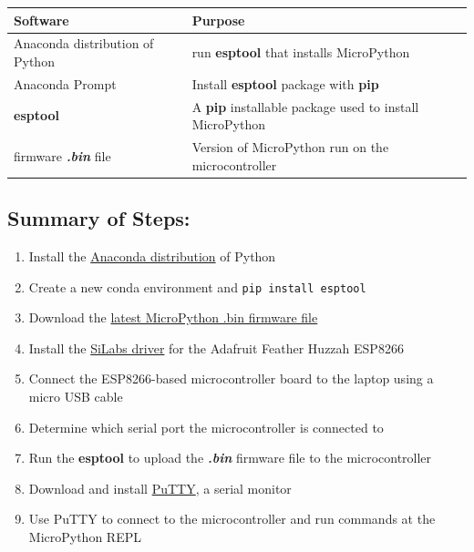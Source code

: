 \documentclass{book}
\providecommand{\tightlist}{%
      \setlength{\itemsep}{0pt}\setlength{\parskip}{0pt}}
\begin{document}
\begin{longtable}[]{@{}ll@{}}
\toprule
Software & Purpose\tabularnewline
\midrule
\endhead
Anaconda distribution of Python & run \textbf{esptool} that installs
MicroPython\tabularnewline
Anaconda Prompt & Install \textbf{esptool} package with
\textbf{pip}\tabularnewline
\textbf{esptool} & A \textbf{pip} installable package used to install
MicroPython\tabularnewline
firmware \textbf{\emph{.bin}} file & Version of MicroPython run on the
microcontroller\tabularnewline
\bottomrule
\end{longtable}
    




    
        \subsection{Summary of Steps:}\label{summary-of-steps}
    




    
        \begin{enumerate}
\def\labelenumi{\arabic{enumi}.}
\tightlist
\item
  Install the \href{https://www.anaconda.com/download/}{Anaconda
  distribution} of Python
\item
  Create a new conda environment and \lstinline!pip install esptool!
\item
  Download the \href{http://micropython.org/download\#esp8266}{latest
  MicroPython .bin firmware file}
\item
  Install the
  \href{https://www.silabs.com/products/development-tools/software/usb-to-uart-bridge-vcp-drivers}{SiLabs
  driver} for the Adafruit Feather Huzzah ESP8266
\item
  Connect the ESP8266-based microcontroller board to the laptop using a
  micro USB cable
\item
  Determine which serial port the microcontroller is connected to
\item
  Run the \textbf{esptool} to upload the \textbf{\emph{.bin}} firmware
  file to the microcontroller
\item
  Download and install \href{https://www.putty.org/}{PuTTY}, a serial
  monitor
\item
  Use PuTTY to connect to the microcontroller and run commands at the
  MicroPython REPL
\end{enumerate}
    
\end{document}
